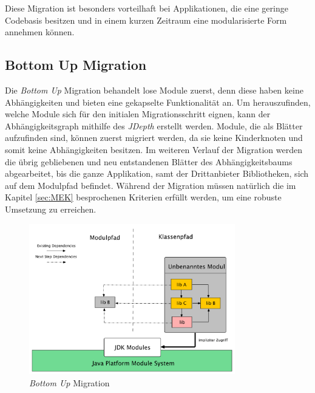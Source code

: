 	Diese Migration ist besonders vorteilhaft bei Applikationen, die eine geringe Codebasis besitzen und in einem kurzen Zeitraum eine modularisierte Form annehmen können. 

\subsection{Bottom Up Migration} \label{sec:bottomUP}
	Die \textit{Bottom Up} Migration behandelt lose Module zuerst, denn diese haben keine Abhängigkeiten und bieten eine gekapselte Funktionalität an. Um herauszufinden, welche Module sich für den initialen Migrationsschritt eignen, kann der Abhängigkeitsgraph mithilfe des \textit{JDepth} erstellt werden. Module, die als Blätter aufzufinden sind, können zuerst migriert werden, da sie keine Kinderknoten und somit keine Abhängigkeiten besitzen. Im weiteren Verlauf der Migration werden die übrig gebliebenen und neu entstandenen Blätter des Abhängigkeitsbaums abgearbeitet, bis die ganze Applikation, samt der Drittanbieter Bibliotheken, sich auf dem Modulpfad befindet. Während der Migration müssen natürlich die im Kapitel \ref{sec:MEK} besprochenen Kriterien erfüllt werden, um eine robuste Umsetzung zu erreichen. \cite{javaMod9,modulProgJava9,java9modRevealed,modulMitJava9,masteringJava9} \bigbreak
	\begin{figure}[h]
		\centering
	    \includegraphics[width=0.8\textwidth]{material/images/down-up-migrate.pdf}
	    \caption{\textit{Bottom Up} Migration \cite{modulMitJava9}}
	    \label{fig:BUM}
  	\end{figure}

